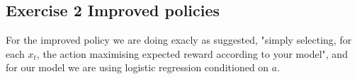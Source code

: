 
\subsection{Exercise 2 Improved policies}

For the improved policy we are doing exacly as suggested, "simply selecting, for each \(x_t\), the action maximising expected reward according to your model", and for our model we are using logistic regression conditioned on \(a\).
